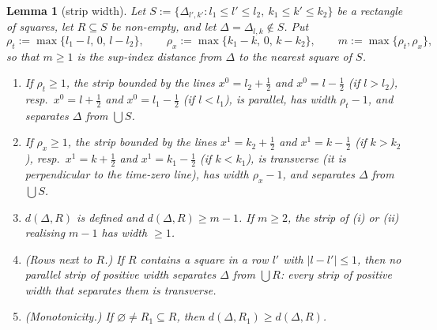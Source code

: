 \documentclass[11pt,a4paper]{article}
\theoremstyle{plain}
\theoremstyle{definition}
\theoremstyle{plain}
\newtheorem{auxlemma}{Lemma}
\theoremstyle{definition}
\begin{document}
\begin{auxlemma}[strip width]\label{aux:notation-strip}
Let $S:=\{\Delta_{l',k'}:l_1\le l'\le l_2,\ k_1\le k'\le k_2\}$ be a rectangle of squares, let
$R\subseteq S$ be non-empty, and let $\Delta=\Delta_{l,k}\notin S$.  Put
\[
 \rho_t:=\max\{l_1-l,\,0,\,l-l_2\},\qquad\rho_x:=\max\{k_1-k,\,0,\,k-k_2\},\qquad
 m:=\max\{\rho_t,\rho_x\},
\]
so that $m\ge1$ is the sup-index distance from $\Delta$ to the nearest square of $S$.
\begin{enumerate}
\item[\textup{(i)}] If $\rho_t\ge1$, the strip bounded by the lines $x^0=l_2+\frac12$ and
$x^0=l-\frac12$ (if $l>l_2$), resp.\ $x^0=l+\frac12$ and $x^0=l_1-\frac12$ (if $l<l_1$), is
\emph{parallel}, has width $\rho_t-1$, and separates $\Delta$ from $\bigcup S$.
\item[\textup{(ii)}] If $\rho_x\ge1$, the strip bounded by the lines $x^1=k_2+\frac12$ and
$x^1=k-\frac12$ (if $k>k_2$), resp.\ $x^1=k+\frac12$ and $x^1=k_1-\frac12$ (if $k<k_1$), is
\emph{transverse} (it is perpendicular to the time-zero line), has width $\rho_x-1$, and
separates $\Delta$ from $\bigcup S$.
\item[\textup{(iii)}] $d(\Delta,R)$ is defined and $d(\Delta,R)\ge m-1$.  If $m\ge2$, the
strip of \textup{(i)} or \textup{(ii)} realising $m-1$ has width $\ge1$.
\item[\textup{(iv)}] \textup{(Rows next to $R$.)}  If $R$ contains a square in a row $l'$
with $|l-l'|\le1$, then no parallel strip of positive width separates $\Delta$ from
$\bigcup R$: every strip of positive width that separates them is transverse.
\item[\textup{(v)}] \textup{(Monotonicity.)}  If $\varnothing\ne R_1\subseteq R$, then
$d(\Delta,R_1)\ge d(\Delta,R)$.
\end{enumerate}
\end{auxlemma}
\end{document}

